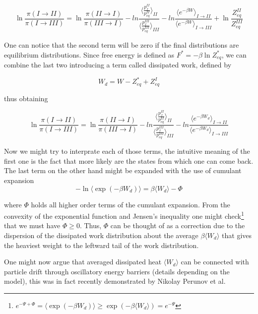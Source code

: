 \documentclass[a4paper,12pt]{article}
\begin{document}
\begin{equation}
  \ln \frac{\pi(I \to II)}{\pi(I \to III)} =
  \ln \frac{\pi(II \to I)}{\pi(III \to I)} - ln \frac{ \langle \frac{p_{f}^{II}}{p_{eq}^{II}}  \rangle_{II}}{ \langle \frac{p_{f}^{III}}{p_{eq}^{III}}  \rangle_{III} }
  -ln \frac{\langle e^{ - \beta W} \rangle_{I \to II}}{\langle e^{ - \beta W} \rangle_{I \to III}} + \ln{\frac{Z_{eq}^{II}}{Z_{eq}^{III} }}
\end{equation}

One can notice that the second term will be zero if the final distributions are equilibrium distributions. Since free energy is defined as $F^* = -\beta \ln Z_{eq}^*$, we can combine the last two introducing a term called dissipated work, defined by

\begin{equation}
  W_d =W - Z_{eq}^* + Z_{eq}^I
\end{equation}

thus obtaining

\begin{equation}
  \ln \frac{\pi(I \to II)}{\pi(I \to III)} =
  \ln \frac{\pi(II \to I)}{\pi(III \to I)} - ln \frac{ \langle \frac{p_{f}^{II}}{p_{eq}^{II}}  \rangle_{II}}{ \langle \frac{p_{f}^{III}}{p_{eq}^{III}}  \rangle_{III} }
  -ln \frac{\langle e^{ - \beta W_d} \rangle_{I \to II}}{\langle e^{ - \beta W_d} \rangle_{I \to III}} 
\end{equation}

Now we might try to interprate each of those terms, the intuitive meaning of the first one is the fact that more likely are the states from which one can come back. The last term on the other hand might be expanded with the use of cumulant expansion
\begin{equation}
  -\ln \langle \exp(-\beta W_d)\rangle= \beta \langle W_d \rangle - \Phi
\end{equation}

where $\Phi$ holds all higher order terms of the cumulant expansion. From the convexity of the exponential function and Jensen's inequality one might check\footnote{$e^{-\Psi + \Phi}=\langle \exp(-\beta W_d) \rangle \geq \exp(-\beta \langle W_d \rangle)= e^{-\Psi}$} that we must have $\Phi \geq 0$. Thus, $\Phi$ can be thought of as a correction due to the dispersion of the dissipated work distribution about the average $\beta \langle W_d \rangle $ that gives the heaviest weight to the leftward tail of the work distribution\cite{Jarzynski:2006cq}.

One might now argue that averaged dissipated heat $\langle W_d \rangle $ can be connected with particle drift through oscillatory energy barriers (details depending on the model), this was in fact recently demonstrated by Nikolay Perunov et al\cite{Perunov:2016hl}.
\end{document}
